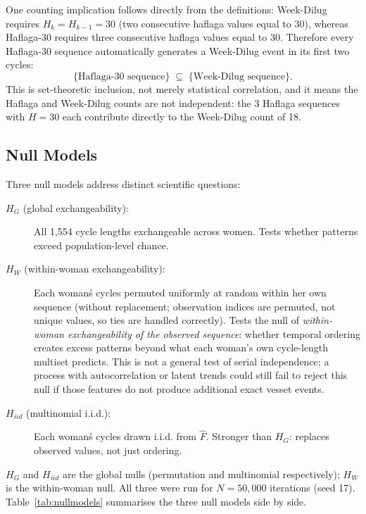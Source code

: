 \documentclass[12pt]{article}
\begin{document}
One counting implication follows directly from the definitions: Week-Dilug requires
$H_k = H_{k-1} = 30$ (two consecutive haflaga values equal to 30), whereas Haflaga-30
requires three consecutive haflaga values equal to 30. Therefore every Haflaga-30 sequence
automatically generates a Week-Dilug event in its first two cycles:
\[
  \{\text{Haflaga-30 sequence}\} \;\subseteq\; \{\text{Week-Dilug sequence}\}.
\]
This is set-theoretic inclusion, not merely statistical correlation, and it means
the Haflaga and Week-Dilug counts are not independent: the 3 Haflaga sequences with
$H = 30$ each contribute directly to the Week-Dilug count of 18.

\subsection{Null Models}
\label{sec:nullmodels}

Three null models address distinct scientific questions:
\begin{description}
  \item[$H_G$ \textnormal{(global exchangeability):}] All 1,554 cycle lengths exchangeable
    across women. Tests whether patterns exceed population-level chance.
  \item[$H_W$ \textnormal{(within-woman exchangeability):}] Each woman\'s cycles permuted uniformly at random within her own sequence (without replacement; observation indices are permuted, not unique values, so ties are handled correctly). Tests the null of \emph{within-woman exchangeability of the observed sequence}: whether temporal ordering creates excess patterns beyond what each woman's own cycle-length multiset predicts. This is not a general test of serial independence; a process with autocorrelation or latent trends could still fail to reject this null if those features do not produce additional exact vesset events.
  \item[$H_{iid}$ \textnormal{(multinomial i.i.d.):}] Each woman\'s cycles drawn i.i.d.
    from $\hat{F}$. Stronger than $H_G$: replaces observed values, not just ordering.
\end{description}

$H_G$ and $H_{iid}$ are the global nulls (permutation and multinomial respectively);
$H_W$ is the within-woman null. All three were run for $N = 50{,}000$ iterations (seed 17).
Table~\ref{tab:nullmodels} summarises the three null models side by side.
\end{document}
